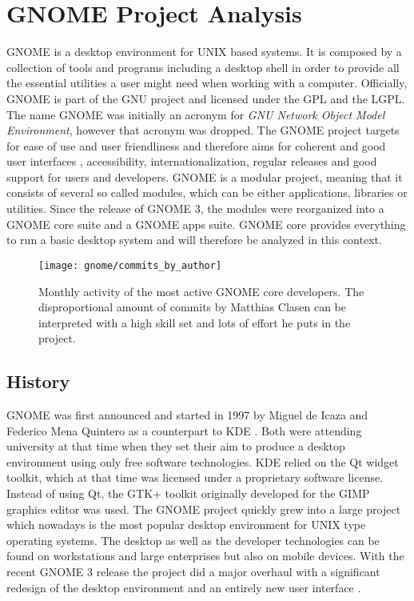 \section{GNOME Project Analysis} %


GNOME is a desktop environment for UNIX based systems. It is composed by a
collection of tools and programs including a desktop shell in order to provide
all the essential utilities a user might need when working with a computer.
Officially, GNOME is part of the GNU project and licensed under the \ac{GPL}
and the \ac{LGPL}. The name GNOME was initially an acronym for \emph{GNU
Network Object Model Environment}, however that acronym was dropped. The GNOME
project targets for ease of use and user friendliness and therefore aims for
coherent and good user interfaces \cite{GNOMEHIG}, accessibility,
internationalization, regular releases and good support for users and
developers. GNOME is a modular project, meaning that it consists of several so
called modules, which can be either applications, libraries or utilities. Since
the release of GNOME 3, the modules were reorganized into a GNOME core suite
and a GNOME apps suite. GNOME core provides everything to run a basic desktop
system and will therefore be analyzed in this context.

\begin{figure}[htbp]
  \centering
  \texttt{[image: gnome/commits\_by\_author]}
  \caption{Monthly activity of the most active GNOME core developers. The
  disproportional amount of commits by Matthias Clasen can be interpreted with
  a high skill set and lots of effort he puts in the project.}
\end{figure}

\subsection{History} %

GNOME was first announced and started in 1997 by Miguel de Icaza and Federico
Mena Quintero as a counterpart to KDE
\cite{German2003,GNOMEAbout,GNOMEAnnouncement}. Both were attending university
at that time when they set their aim to produce a desktop environment using
only free software technologies. KDE relied on the Qt widget toolkit, which at
that time was licensed under a proprietary software license. Instead of using
Qt, the GTK+ toolkit originally developed for the GIMP graphics editor was
used. The GNOME project quickly grew into a large project which nowadays is the
most popular desktop environment for UNIX type operating systems. The desktop
as well as the developer technologies can be found on workstations and large
enterprises but also on mobile devices. With the recent GNOME 3 release the
project did a major overhaul with a significant redesign of the desktop
environment and an entirely new user interface \cite{GNOMEPress}.

